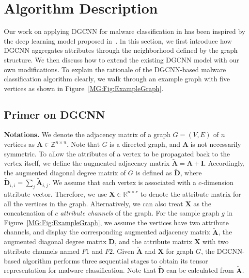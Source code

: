 \section{Algorithm Description}
\label{MG:Sec:DGCNN}

Our work on applying DGCNN for malware classification in \sysname has been inspired by the deep learning model proposed in~\cite{Dgcnn}. In this section, we first introduce how DGCNN aggregates attributes through the neighborhood defined by the graph structure. We then discuss how to extend the existing DGCNN model with our own modifications. To explain the rationale of the DGCNN-based malware classification algorithm clearly, we walk through an example graph with five vertices as shown in Figure~\ref{MG:Fig:ExampleGraph}.

\subsection{Primer on DGCNN}

\textbf{Notations.} We denote the adjacency matrix of a graph $G=(V, E)$ of $n$ vertices as $\mathbf{A} \in \mathbb{Z} ^{n\times n}$.
Note that $G$ is a directed graph, and $\mathbf{A}$ is not necessarily symmetric.
To allow the attributes of a vertex to be propagated back to the vertex itself, we define the augmented adjacency matrix $\tilde{\mathbf{A}} = \mathbf{A} + \mathbf{I}$.
Accordingly, the augmented diagonal degree matrix of $G$ is defined as $\tilde{\mathbf{D}}$, where
$\tilde{\mathbf{D}}_{i,i} = \sum_j \tilde{\mathbf{A}}_{i,j}$.
We assume that each vertex is associated with a $c$-dimension attribute vector.
Therefore, we use $\mathbf{X} \in \mathbb{R}^{n \times c}$ to denote the attribute matrix for all the vertices in the graph. %
Alternatively, we can also treat $\mathbf{X}$ as the concatenation of $c$ \textit{attribute channels} of the graph.
For the sample graph $g$ in Figure~\ref{MG:Fig:ExampleGraph}, we assume the vertices have two attribute channels,
and display the corresponding augmented adjacency matrix $\tilde{\mathbf{A}}$, the augmented diagonal degree matrix $\tilde{\mathbf{D}}$,
and the attribute matrix $\mathbf{X}$ with two attribute channels named $F1$ and $F2$.
Given $\tilde{\mathbf{A}}$ and $\mathbf{X}$ for graph $G$, the DGCNN-based algorithm performs three sequential stages to obtain its tensor representation for malware classification. Note that $\tilde{\mathbf{D}}$ can be calculated from $\tilde{\mathbf{A}}$.

